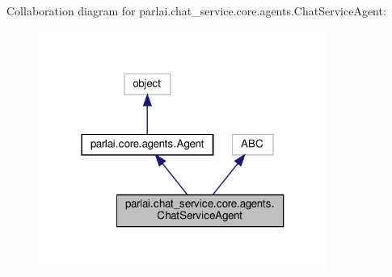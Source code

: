 Collaboration diagram for parlai.\+chat\+\_\+service.\+core.\+agents.\+Chat\+Service\+Agent\+:
\nopagebreak
\begin{figure}[H]
\begin{center}
\leavevmode
\includegraphics[width=268pt]{d9/daa/classparlai_1_1chat__service_1_1core_1_1agents_1_1ChatServiceAgent__coll__graph}
\end{center}
\end{figure}
